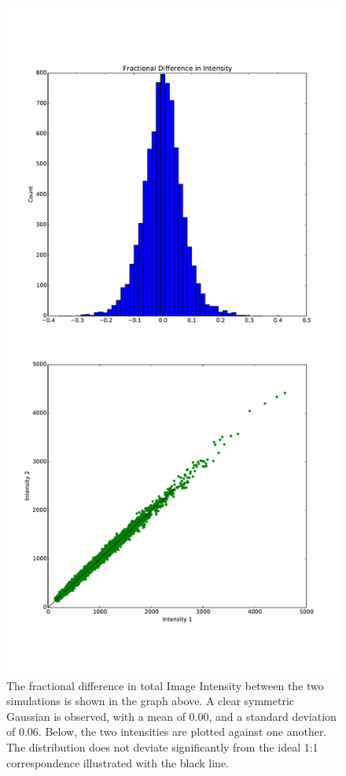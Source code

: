 \documentclass[11pt]{article}
\begin{document}
\begin{figure}
\begin{center}
\includegraphics[height=0.9\textheight]{simtelerror1}
\caption{The fractional difference in total Image Intensity between the two simulations is shown in the graph above. A clear symmetric Gaussian is observed, with a mean of 0.00, and a standard deviation of 0.06. Below, the two intensities are plotted against one another. The distribution does not deviate significantly from the ideal 1:1 correspondence illustrated with the black line.}
\label{fig:simtelerror}
\end{center}
\end{figure} 
\end{document}
